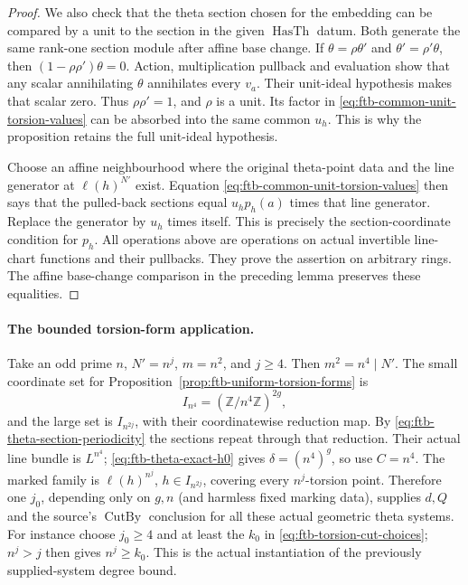 \begin{proof}
We also check that the theta section chosen for the
embedding can be compared by a unit to the section in
the given \(\operatorname{HasTh}\) datum.
Both generate the same rank-one section module after
affine base change.
If \(\theta=\rho\theta'\) and
\(\theta'=\rho'\theta\), then
\((1-\rho\rho')\theta=0\).
Action, multiplication pullback and evaluation show
that any scalar annihilating \(\theta\) annihilates
every \(v_a\).
Their unit-ideal hypothesis makes that scalar zero.
Thus \(\rho\rho'=1\), and \(\rho\) is a unit.
Its factor in \eqref{eq:ftb-common-unit-torsion-values}
can be absorbed into the same common \(u_h\).
This is why the proposition retains the full
unit-ideal hypothesis.

Choose an affine neighbourhood where the original
theta-point data and the line generator at
\(\ell(h)^{N'}\) exist.
Equation \eqref{eq:ftb-common-unit-torsion-values}
then says that the pulled-back sections equal
\(u_h p_h(a)\) times that line generator.
Replace the generator by \(u_h\) times itself.
This is precisely the section-coordinate condition
for \(p_h\).
All operations above are operations on actual
invertible line-chart functions and their pullbacks.
They prove the assertion on arbitrary rings.
The affine base-change comparison in the preceding
lemma preserves these equalities.
\end{proof}

\paragraph{The bounded torsion-form application.}
Take an odd prime \(n\), \(N'=n^j\), \(m=n^2\), and \(j\ge4\).
Then \(m^2=n^4\mid N'\).
The small coordinate set for
Proposition~\ref{prop:ftb-uniform-torsion-forms} is
\[
                  I_{n^4}=(\mathbb Z/n^4\mathbb Z)^{2g},
\]
and the large set is \(I_{n^{2j}}\), with their
coordinatewise reduction map.
By \eqref{eq:ftb-theta-section-periodicity} the
sections repeat through that reduction.
Their actual line bundle is \(L^{n^4}\);
\eqref{eq:ftb-theta-exact-h0} gives
\(\delta=(n^4)^g\), so use \(C=n^4\).
The marked family is
\(\ell(h)^{n^j}\), \(h\in I_{n^{2j}}\), covering every
\(n^j\)-torsion point.
Therefore one \(j_0\), depending only on \(g,n\)
(and harmless fixed marking data), supplies \(d,Q\)
and the source's \(\operatorname{CutBy}\) conclusion
for all these actual geometric theta systems.
For instance choose \(j_0\ge4\) and at least the
\(k_0\) in \eqref{eq:ftb-torsion-cut-choices};
\(n^j>j\) then gives \(n^j\ge k_0\).
This is the actual instantiation of the previously
supplied-system degree bound.

